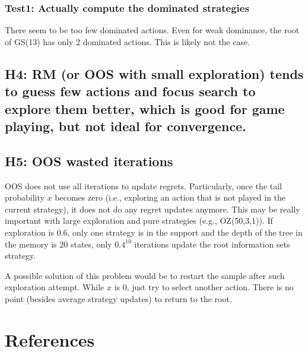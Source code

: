 \documentclass[preprint,12pt]{elsarticle}
\begin{document}
\subsubsection{Test1: Actually compute the dominated strategies}

There seem to be too few dominated actions. Even for weak dominance, the root of GS(13) has only 2 dominated actions. This is likely not the case.


\subsection{H4: RM (or OOS with small exploration) tends to guess few actions and focus search to explore them better, which is good for game playing, but not ideal for convergence.}

\subsection{H5: OOS wasted iterations}
OOS does not use all iterations to update regrets. Particularly, once the tail probability $x$ becomes zero (i.e., exploring an action that is not played in the current strategy), it does not do any regret updates anymore. This may be really important with large exploration and pure strategies (e.g., OZ(50,3,1)). If exploration is 0.6, only one strategy is in the support and the depth of the tree in the memory is 20 states, only $0.4^10$ iterations update the root information sets strategy.

A possible solution of this problem would be to restart the sample after such exploration attempt. While $x$ is 0, just try to select another action. There is no point (besides average strategy updates) to return to the root.


\section*{References}


\end{document}
